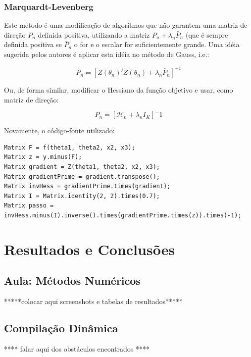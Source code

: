 \documentclass{abnt}
\newenvironment{mylisting}
{\begin{list}{}{\setlength{\leftmargin}{1em}}\item\scriptsize\bfseries}
{\end{list}}
\begin{document}
\subsection{Marquardt-Levenberg}

Este método é uma modificação de algoritmos que não garantem uma matriz de direção $P_n$ definida positiva, utilizando a matriz $P_n + \lambda_n\bar P_n$ (que é sempre definida positiva se $\bar P_n$ o for e o escalar for suficientemente grande. Uma idéia sugerida pelos autores é aplicar esta idéia no método de Gauss, i.e.:

\[ P_n = [Z(\theta_n)'Z(\theta_n) + \lambda_n\bar P_n]^{-1} \]

Ou, de forma similar, modificar o Hessiano da função objetivo e usar, como matriz de direção:

\[ P_n = [\mathcal{H}_n+\lambda_nI_K]^-1 \]

Novamente, o código-fonte utilizado:

\begin{mylisting}
\begin{verbatim}
Matrix F = f(theta1, theta2, x2, x3);
Matrix z = y.minus(F);
Matrix gradient = Z(theta1, theta2, x2, x3);
Matrix gradientPrime = gradient.transpose();
Matrix invHess = gradientPrime.times(gradient);
Matrix I = Matrix.identity(2, 2).times(0.7);
Matrix passo = invHess.minus(I).inverse().times(gradientPrime.times(z)).times(-1);
\end{verbatim}
\end{mylisting}


\chapter {Resultados e Conclusões}

\section{Aula: Métodos Numéricos}

*****colocar aqui screenshots e tabelas de resultados*****

\section{Compilação Dinâmica}

**** falar aqui dos obstáculos encontrados ****

\end{document}
